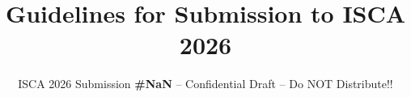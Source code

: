 \documentclass[conference]{IEEEtran}
\begin{document}
\pdfpagewidth=8.5in
\pdfpageheight=11in

\newcommand{\iscasubmissionnumber}{NaN}


\title{Guidelines for Submission to ISCA 2026}
\author{\normalsize{ISCA 2026 Submission
    \textbf{\#\iscasubmissionnumber} -- Confidential Draft -- Do NOT Distribute!!}}


\maketitle
\thispagestyle{plain}
\pagestyle{plain}



 
\end{document}
